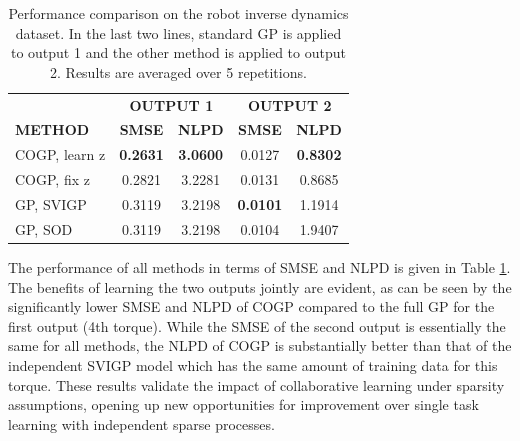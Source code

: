 \begin{table}[t]
\caption{Performance comparison on the robot inverse dynamics dataset. In the last two lines, standard GP is applied to output 1 and the other method is applied to output 2. Results are averaged over 5 repetitions. }
\label{tab:robotarm}
\begin{center}
\begin{tabular}{lcccc}
\toprule
& \multicolumn{2}{c}{\textbf{OUTPUT 1}} & \multicolumn{2}{c}{\textbf{OUTPUT 2}} \\ \cmidrule(r){2-5}
\textbf{METHOD} & \textbf{SMSE} & \textbf{NLPD} & \textbf{SMSE} & \textbf{NLPD}\\ 
 \midrule
COGP, learn z & \textbf{0.2631} & \textbf{3.0600} & 0.0127 & \textbf{0.8302} \\
COGP, fix z & 0.2821& 3.2281 & 0.0131 & 0.8685 \\
GP, SVIGP & 0.3119 & 3.2198 & \textbf{0.0101} & 1.1914 \\
GP, SOD & 0.3119 & 3.2198 & 0.0104 & 1.9407 \\
\bottomrule
\end{tabular}
\end{center}
\end{table}

The performance of all methods in terms of SMSE and NLPD is given in Table \ref{tab:robotarm}.
The benefits of learning the two outputs jointly are evident, as can be seen by the significantly lower SMSE and NLPD of COGP compared to the full GP for the first output (4th torque).
While the SMSE of the second output is essentially the same for all methods, the NLPD of COGP is substantially better than that of the independent SVIGP model which has the same amount of training data for this torque.
These results validate the impact of collaborative learning under sparsity assumptions,  opening up new opportunities for improvement over single task learning with independent sparse processes.

